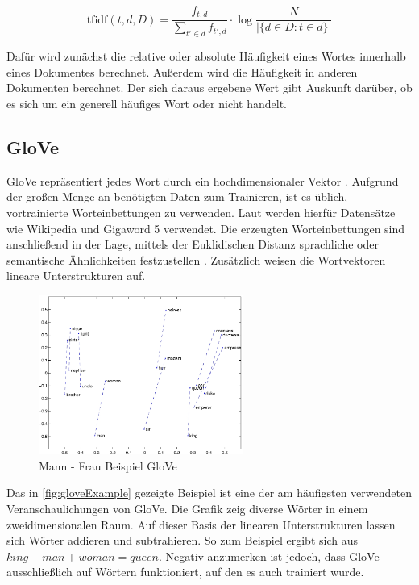 \[\mathrm{tfidf}(t,d,D) = \frac{f_{t,d}}{{\sum_{t' \in d}{f_{t',d}}}} \cdot \log \frac{N}{|\{d \in D: t \in d\}|}\]

Dafür wird zunächst die relative oder absolute Häufigkeit eines Wortes innerhalb eines Dokumentes berechnet. Außerdem wird die Häufigkeit in anderen Dokumenten berechnet. Der sich daraus ergebene Wert gibt Auskunft darüber, ob es sich um ein generell häufiges Wort oder nicht handelt.

\subsection*{GloVe}

\ac{GloVe} repräsentiert jedes Wort durch ein hochdimensionaler Vektor \autocite[8\psq]{kowsari_text_2019}. Aufgrund der großen Menge an benötigten Daten zum Trainieren, ist es üblich, vortrainierte Worteinbettungen zu verwenden. Laut \citeauthor{kowsari_text_2019} werden hierfür Datensätze wie Wikipedia und Gigaword \num{5} verwendet. Die erzeugten Worteinbettungen sind anschließend in der Lage, mittels der Euklidischen Distanz sprachliche oder semantische Ähnlichkeiten festzustellen \autocite{pennington_glove_2014}. Zusätzlich weisen die Wortvektoren lineare Unterstrukturen auf.

\begin{figure}[H]
  \centering
  \includegraphics[width=0.6\textwidth]{data/images/materials_and_methods/man_woman.jpg}
  \caption{Mann - Frau Beispiel \acs{GloVe} \autocite{pennington_glove_2014}} \label{fig:gloveExample}
\end{figure}

Das in \autoref{fig:gloveExample} gezeigte Beispiel ist eine der am häufigsten verwendeten Veranschaulichungen von \ac{GloVe}. Die Grafik zeig diverse Wörter in einem zweidimensionalen Raum. Auf dieser Basis der linearen Unterstrukturen lassen sich Wörter addieren und subtrahieren. So zum Beispiel ergibt sich aus \(king - man + woman = queen\). Negativ anzumerken ist jedoch, dass \ac{GloVe} ausschließlich auf Wörtern funktioniert, auf den es auch trainiert wurde.

